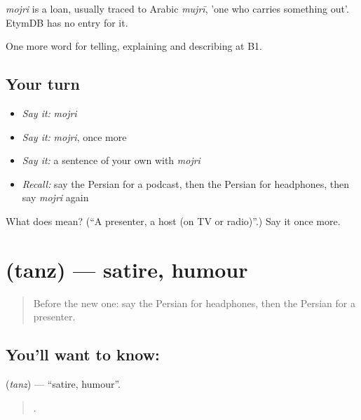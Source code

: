 \begin{cousinweb}
\emph{mojri} is a loan, usually traced to Arabic \emph{mujrī}, 'one who carries something out'. EtymDB has no entry for it.
\end{cousinweb}

\begin{grammarlens}[title={What you've built}]
One more word for telling, explaining and describing at B1.
\end{grammarlens}

\subsection*{Your turn}
\begin{itemize}
\raggedright
  \item \emph{Say it:} \emph{mojri}
  \item \emph{Say it:} \emph{mojri}, once more
  \item \emph{Say it:} a sentence of your own with \emph{mojri}
  \item \emph{Recall:} say the Persian for a podcast, then the Persian for headphones, then say \emph{mojri} again
\end{itemize}

\begin{tcolorbox}[breakable,colback=teal!4,colframe=teal!35!black,title={Before you move on}]
What does  mean? (\textquotedblleft{}A presenter, a host (on TV or radio)\textquotedblright{}.) Say it once more.
\end{tcolorbox}
\section[\texorpdfstring{\fa{طنز} (tanz)}{طنز (tanz)}]{ (tanz) — satire, humour}

\label{lesson:FA-C533-tanz}



\begin{quote}
Before the new one: say the Persian for headphones, then the Persian for a presenter.
\end{quote}

\subsection*{You'll want to know: }
\textbf{} (\emph{tanz}) — \textquotedblleft{}satire, humour\textquotedblright{}.

\begin{quote}
    .
\end{quote}

